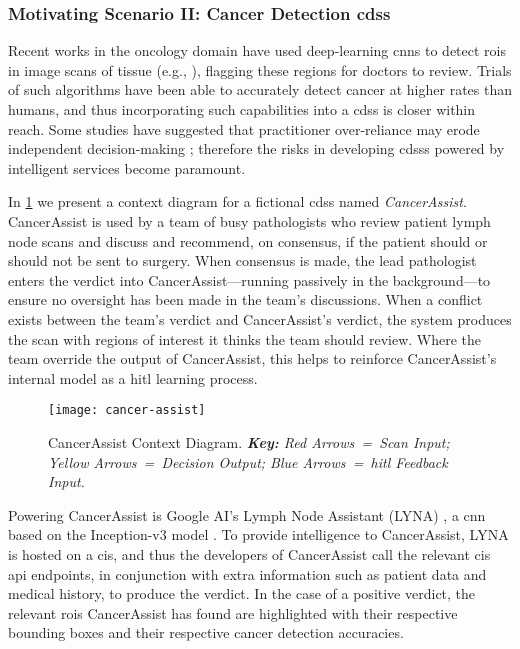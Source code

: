 
\subsubsection{Motivating Scenario II: Cancer Detection \gls{cdss}}
\label{ssec:introduction:motivation:scenario:cancer}

Recent works in the oncology domain have used deep-learning \glspl{cnn} to detect \glspl{roi} in image scans of tissue (e.g., \citep{Liu:2018fa,Haenssle:2018bz,EhteshamiBejnordi:2017kq}), flagging these regions for doctors to review. Trials of such algorithms have been able to accurately detect cancer at higher rates than humans, and thus incorporating such capabilities into a \gls{cdss} is closer within reach. Some studies have suggested that practitioner over-reliance may erode independent decision-making \citep{Jaspers:2011hy,Chambers:1991uh}; therefore the risks in developing \glspl{cdss} powered by intelligent services become paramount.

In \cref{fig:introduction:motivation:scenario:cancer} we present a context diagram for a fictional \gls{cdss} named \textit{CancerAssist}. CancerAssist is used by a team of busy pathologists who review patient lymph node scans and discuss and recommend, on consensus, if the patient should or should not be sent to surgery. When consensus is made, the lead pathologist enters the verdict into CancerAssist---running passively in the background---to ensure no oversight has been made in the team's discussions. When a conflict exists between the team's verdict and CancerAssist's verdict, the system produces the scan with regions of interest it thinks the team should review. Where the team override the output of CancerAssist, this helps to reinforce CancerAssist's internal model as a \gls{hitl} learning process.

\begin{figure}[th]
  \texttt{[image: cancer-assist]}
  \caption[CancerAssist Context Diagram]{CancerAssist Context Diagram. \textit{\textbf{Key:} Red Arrows~=~Scan Input; Yellow Arrows~=~Decision Output; Blue Arrows~=~\gls{hitl} Feedback Input.}}
  \label{fig:introduction:motivation:scenario:cancer}
\end{figure}

Powering CancerAssist is Google AI's Lymph Node Assistant (LYNA) \citep{Liu:2018fa}, a \gls{cnn} based on the Inception-v3 model \citep{Szegedy:2016ws,Krizhevsky:2012wl}. To provide intelligence to CancerAssist, LYNA is hosted on a \gls{cis}, and thus the developers of CancerAssist call the relevant \gls{cis} \gls{api} endpoints, in conjunction with extra information such as patient data and medical history, to produce the verdict. In the case of a positive verdict, the relevant \glspl{roi} CancerAssist has found are highlighted with their respective bounding boxes and their respective cancer detection accuracies.

